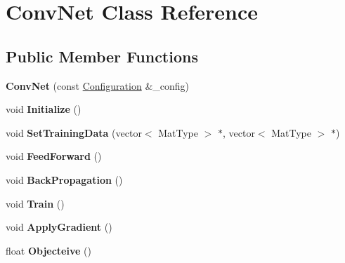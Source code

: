 \hypertarget{class_conv_net}{\section{Conv\+Net Class Reference}
\label{class_conv_net}
}
\subsection*{Public Member Functions}
\begin{DoxyCompactItemize}
\item 
\hypertarget{class_conv_net_a8469424911e8edd4300e8dc09db977d1}{{\bfseries Conv\+Net} (const \hyperlink{struct_configuration}{Configuration} \&\+\_\+config)}\label{class_conv_net_a8469424911e8edd4300e8dc09db977d1}

\item 
\hypertarget{class_conv_net_a1002e8eca863e7b21bf3d346534c91a3}{void {\bfseries Initialize} ()}\label{class_conv_net_a1002e8eca863e7b21bf3d346534c91a3}

\item 
\hypertarget{class_conv_net_ac5a073e999f383bacdfb465bc1cdfd15}{void {\bfseries Set\+Training\+Data} (vector$<$ Mat\+Type $>$ $\ast$, vector$<$ Mat\+Type $>$ $\ast$)}\label{class_conv_net_ac5a073e999f383bacdfb465bc1cdfd15}

\item 
\hypertarget{class_conv_net_a38131e53f29ba33f57b9e69640593bed}{void {\bfseries Feed\+Forward} ()}\label{class_conv_net_a38131e53f29ba33f57b9e69640593bed}

\item 
\hypertarget{class_conv_net_aa0508fd5e41578696b8762f302508923}{void {\bfseries Back\+Propagation} ()}\label{class_conv_net_aa0508fd5e41578696b8762f302508923}

\item 
\hypertarget{class_conv_net_abf4d97bb7264d7cc8e8beeb550468710}{void {\bfseries Train} ()}\label{class_conv_net_abf4d97bb7264d7cc8e8beeb550468710}

\item 
\hypertarget{class_conv_net_ad71767dc3d463f60346ac71ff2c1c4ff}{void {\bfseries Apply\+Gradient} ()}\label{class_conv_net_ad71767dc3d463f60346ac71ff2c1c4ff}

\item 
\hypertarget{class_conv_net_a9b9e2e5e1c4d84be553b2729efb44b10}{float {\bfseries Objecteive} ()}\label{class_conv_net_a9b9e2e5e1c4d84be553b2729efb44b10}

\end{DoxyCompactItemize}
